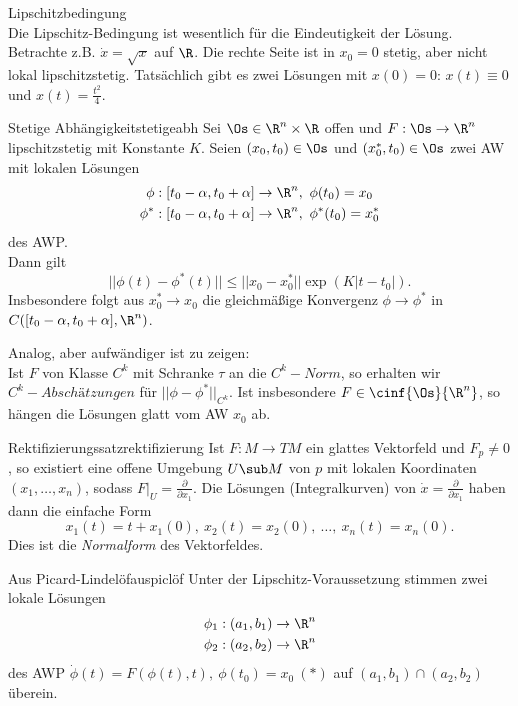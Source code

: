 \begin{beispiel}Lipschitzbedingung\\
Die Lipschitz-Bedingung ist wesentlich für die Eindeutigkeit der Lösung. Betrachte z.B. $\dot{x} = \sqrt{x}$ auf $\R$. Die rechte Seite ist in $x_0 = 0$ stetig, aber nicht lokal lipschitzstetig. Tatsächlich gibt es zwei Lösungen mit $x(0)=0$: $x(t)\equiv 0$ und $x(t)=\frac{t^2}{4}$.
\end{beispiel}
\begin{satz}{Stetige Abhängigkeit}{stetigeabh}
Sei $\Os \in \R^n \times \R$ offen und $F: \Os \to \R^n$ lipschitzstetig mit Konstante $K$. Seien $(x_0, t_0) \in \Os$ und $(x_0^\ast, t_0) \in \Os$ zwei AW mit lokalen Lösungen 
\begin{align}
\phi: [t_0 - \alpha, t_0 + \alpha] &\to \R^n, \ \phi(t_0)=x_0 \\
\phi^\ast: [t_0 - \alpha, t_0 + \alpha] &\to \R^n, \ \phi^\ast(t_0)=x_0^\ast
\end{align}
des AWP.\\
Dann gilt
\begin{equation}
|| \phi(t)-\phi^\ast(t)|| \leq ||x_0-x_0^\ast||\exp(K|t-t_0|).
\end{equation}
Insbesondere folgt aus $x_0^\ast \to x_0$ die gleichmäßige Konvergenz $\phi \to \phi^\ast$ in $C([t_0-\alpha, t_0 + \alpha], \R^n)$.
\end{satz}
\begin{bemerkung}
Analog, aber aufwändiger ist zu zeigen:\\
Ist $F$ von Klasse $C^k$ mit Schranke $\tau$ an die $C^k-Norm$, so erhalten wir $C^k-Abschätzungen$ für $||\phi - \phi^\ast||_{C^k}$. Ist insbesondere $F \in \cinf{\Os}{\R^n}$, so hängen die Lösungen glatt vom AW $x_0$ ab.
\end{bemerkung}
\begin{satz}{Rektifizierungssatz}{rektifizierung}
Ist $F: M \to TM$ ein glattes Vektorfeld und $F_p \neq 0$, so existiert eine offene Umgebung $U \sub M$ von $p$ mit lokalen Koordinaten $(x_1, \dots, x_n)$, sodass $F|_U = \frac{\partial}{\partial x_1}$. Die Lösungen (Integralkurven) von $\dot{x} = \frac{\partial}{\partial x_1}$ haben dann die einfache Form
\begin{equation}
x_1(t)=t+x_1(0), \ x_2(t)=x_2(0), \ \dots, \ x_n(t)=x_n(0).
\end{equation}
Dies ist die \textit{Normalform} des Vektorfeldes.
\end{satz}
\begin{korollar}{Aus Picard-Lindelöf}{auspiclöf}
Unter der Lipschitz-Voraussetzung stimmen zwei lokale Lösungen
\begin{align}
\phi_1: (a_1, b_1) &\to \R^n \\
\phi_2: (a_2, b_2) &\to \R^n
\end{align}
des AWP $\dot{\phi}(t)=F(\phi(t), t), \ \phi(t_0)=x_0 \ (\ast)$ auf $(a_1, b_1) \cap (a_2, b_2)$ überein.
\end{korollar}
